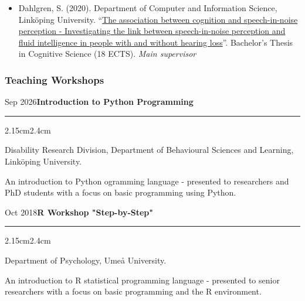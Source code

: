 \documentclass[]{article}
\begin{document}
\begin{itemize}
{  påverkas av deras koppling till sitt framtida jag (How young people's
  attitudes to hearing impairments caused by leisure noise are affected
  by their connection to their future selves)}''. Bachelor's Thesis in
  Cognitive Science (18 ECTS). \emph{Main supervisor}
\item
  Dahlgren, S. (2020). Department of Computer and Information Science,
  Linköping University.
  ``\href{http://liu.diva-portal.org/smash/record.jsf?dswid=-6296&faces-redirect=true&language=en&searchType=SIMPLE&query=Marsja&af=\%5B\%5D&aq=\%5B\%5B\%5D\%5D&aq2=\%5B\%5B\%5D\%5D&aqe=\%5B\%5D&pid=diva2\%3A1443600&noOfRows=50&sortOrder=author_sort_asc&sortOrder2=title_sort_asc&onlyFullText=false&sf=undergraduate}{The
  association between cognition and speech-in-noise perception -
  Investigating the link between speech-in-noise perception and fluid
  intelligence in people with and without hearing loss}''. Bachelor's
  Thesis in Cognitive Science (18 ECTS). \emph{Main supervisor}
\end{itemize}

\subsubsection{Teaching Workshops}\label{teaching-workshops}

Sep
2026\hspace{0.75cm}\textbf{Introduction to Python Programming}\vspace{1mm}

\hrule
\begin{changemargin}{2.15cm}{2.4cm}


Disability Research Division, Department of Behavioural Sciences and Learning, Linköping University.

An introduction to Python ogramming language - presented to researchers and PhD students with a focus on basic programming using Python.
\end{changemargin}

Oct 2018\hspace{0.75cm}\textbf{R Workshop "Step-by-Step"}\vspace{1mm}

\hrule
\begin{changemargin}{2.15cm}{2.4cm}


Department of Psychology, Umeå University.

An introduction to R statistical programming language - presented to senior researchers with a focus on basic programming and the R environment.

\end{changemargin}
\end{document}
